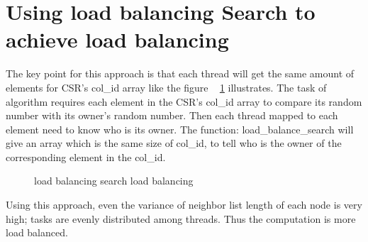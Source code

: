 \documentclass[12pt] {article}
\begin{document}
\section*{Using load balancing Search to achieve load balancing }

The key point for this approach is that each thread will get the same amount of elements for CSR's col\_id array like the figure  ~ \ref{fig:fig2} illustrates. The task of algorithm requires each element in the CSR's col\_id array to compare its random number with its owner's random number. Then each thread mapped to each element need to know who is its owner. The function: load\_balance\_search will give an array which is the same size of col\_id, to tell who is the owner of the corresponding element in the col\_id. 

\begin{figure}[!tbh]
\centering        
   \caption{ load balancing search load balancing }
   \label{fig:fig2}
\end{figure}

Using this approach, even the variance of neighbor list length of each node is very high; tasks are evenly distributed among threads. Thus the computation is more load balanced.
\\\\\\\\\\\\\\\\\\\\\\\\\\\\\\\\\\\\\
\end{document}
